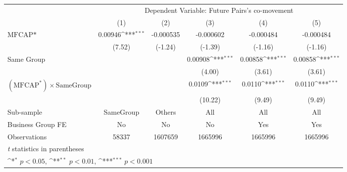 {
\def\sym#1{\ifmmode^{#1}\else\(^{#1}\)\fi}
\begin{tabular}{l*{5}{c}}
\hline\hline
                &\multicolumn{5}{c}{Dependent Variable: Future Pairs's co-movement}                            \\\cmidrule(lr){2-6}
                &\multicolumn{1}{c}{(1)}         &\multicolumn{1}{c}{(2)}         &\multicolumn{1}{c}{(3)}         &\multicolumn{1}{c}{(4)}         &\multicolumn{1}{c}{(5)}         \\
\hline
$ \text{MFCAP*} $&  0.00946\sym{***}&-0.000535         &-0.000602         &-0.000484         &-0.000484         \\
                &   (7.52)         &  (-1.24)         &  (-1.39)         &  (-1.16)         &  (-1.16)         \\
[1em]
Same Group      &                  &                  &  0.00908\sym{***}&  0.00858\sym{***}&  0.00858\sym{***}\\
                &                  &                  &   (4.00)         &   (3.61)         &   (3.61)         \\
[1em]
 $ (\text{MFCAP}^*) \times {\text{SameGroup} }  $ &                  &                  &   0.0109\sym{***}&   0.0110\sym{***}&   0.0110\sym{***}\\
                &                  &                  &  (10.22)         &   (9.49)         &   (9.49)         \\
\hline
Sub-sample      &SameGroup         &   Others         &      All         &      All         &      All         \\
Business Group FE&       No         &       No         &       No         &      Yes         &      Yes         \\
Observations    &    58337         &  1607659         &  1665996         &  1665996         &  1665996         \\
\hline\hline
\multicolumn{6}{l}{\footnotesize \textit{t} statistics in parentheses}\\
\multicolumn{6}{l}{\footnotesize \sym{*} \(p<0.05\), \sym{**} \(p<0.01\), \sym{***} \(p<0.001\)}\\
\end{tabular}
}

